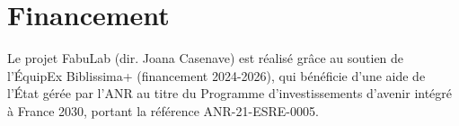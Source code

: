 \documentclass[final,fra]{anthology-ch}         %
\begin{document}
\section*{Financement}

Le projet FabuLab (dir. Joana Casenave) est réalisé grâce au soutien de l'ÉquipEx Biblissima+ (financement 2024-2026), qui bénéficie d'une aide de l’État gérée par l'ANR au titre du Programme d'investissements d'avenir intégré à France 2030, portant la référence ANR-21-ESRE-0005.


\nocite{*}
\printbibliography
\end{document}
